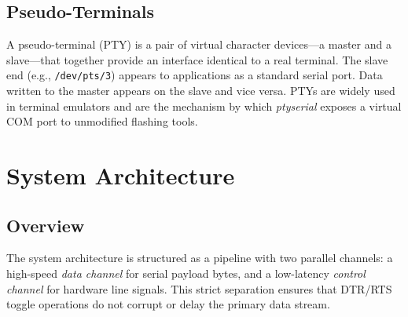 \documentclass[conference]{IEEEtran}
\begin{document}
\subsection{Pseudo-Terminals}

A pseudo-terminal (PTY) \cite{posixpty} is a pair of virtual character devices—a master and a slave—that together provide an interface identical to a real terminal. The slave end (e.g., \texttt{/dev/pts/3}) appears to applications as a standard serial port. Data written to the master appears on the slave and vice versa. PTYs are widely used in terminal emulators and are the mechanism by which \textit{ptyserial} exposes a virtual COM port to unmodified flashing tools.

\section{System Architecture}
\label{sec:architecture}

\subsection{Overview}

The system architecture is structured as a pipeline with two parallel channels: a high-speed \textit{data channel} for serial payload bytes, and a low-latency \textit{control channel} for hardware line signals. This strict separation ensures that DTR/RTS toggle operations do not corrupt or delay the primary data stream.
\end{document}
